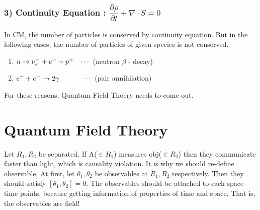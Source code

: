 \documentclass[11pt,letterpaper]{article}
\begin{document}
\VS

\subsubsection*{3) Continuity Equation : $\dfrac{\partial\rho}{\partial t} + \nabla\cdot S = 0 $}

In CM, the number of particles is conserved by continuity equation. But in the following cases, the number of particles of given species is not conserved.

\begin{enumerate}
\item $n \rightarrow \nu^-_e + e^- + p^+ \hspace{0.3cm} \cdots$ (neutron $\beta$ - decay)
\item $e^+ + e^- \rightarrow 2\gamma \hspace{1.1cm} \cdots$ (pair annihilation)
\end{enumerate}

For these reasons, Quantum Field Thoery needs to come out.

\newpage

\section*{Quantum Field Theory}

Let $R_1,R_2$ be separated. If A($\in R_1$) measures obj($\in R_2$) then they communicate faster than light, which is causality violation.
It is why we should re-define observable.
At first, let $\theta_{1}, \theta_{2}$ be observables at $R_{1},R_{2}$ respectively. Then they should satisfy $\left[\theta_{1} , \theta_{2}\right]=0$.
The observables should be attached to each space-time points, because getting information of properties of time and space.
That is, the observables are field!

\vs
\end{document}
